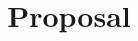 \documentclass{beamer}
\title{Proposal}
\begin{document}
\frame{\titlepage} 
\begin{frame}
	
\end{frame}
\end{document}
